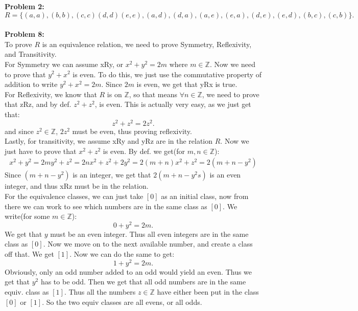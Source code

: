 \documentclass[12pt]{article}
\begin{document}
\noindent
\textbf{Problem 2: }\\
\[
	R = \{(a,a), (b,b), (c,c) (d,d) (e,e), 
	(a,d), (d,a), (a,e), (e,a), (d,e), (e,d), 
	(b,c), (c,b)\}
.\]\\

\noindent
\textbf{Problem 8: }\\
To prove $R$ is an equivalence relation, we need to prove Symmetry, Reflexivity,
and Transitivity.\\
For Symmetry we can assume xRy, or  $x^2 + y^2 = 2m$ where $m \in \mathbb{Z}$. 
Now we need to prove that  $y^2 + x^2$ is even. To do this, we just use the
commutative property of addition to write $y^2 + x^2 = 2m$. Since $2m$ is even,
we get that yRx is true. \\
For Reflexivity, we know that $R$ is on $\mathbb{Z}$, so that means
$\forall n \in \mathbb{Z}$, we need to prove that zRz, and by def. $z^2+z^2$, is even.
This is actually very easy, as we just get that:
\[
z^2+z^2 = 2z^2
.\] 
and since $z^2 \in \mathbb{Z}$, $2z^2$ must be even, thus proving reflexivity.\\
Lastly, for transitivity, we assume xRy and yRz are in the relation $R$. Now 
we just have to prove that $x^2 + z^2$ is even. By def. we get(for $m,n \in \mathbb{Z}$):
\begin{align}
	x^2+y^2=2m
	y^2+z^2=2n
	x^2+z^2+2y^2=2(m+n)
	x^2+z^2 = 2(m+n-y^2)
\end{align}
Since $(m+n-y^2)$ is an integer, we get that $2(m+n-y^2s)$ is an even integer,
and thus xRz must be in the relation. \\
For the equivalence classes, we can just take $[0]$ as an initial class, now from
there we can work to see which numbers are in the same class as  $[0]$. 
We write(for some $m \in \mathbb{Z}$):
 \[
0 + y^2 = 2m
.\] 
We get that $y$ must be an even integer. Thus all even integers are in the same
class as  $[0]$. Now we move on to the next available number, and create a class off
that. We get $[1]$. Now we can do the same to get:
 \[
1+y^2 = 2m
.\] 
Obviously, only an odd number added to an odd would yield an even. Thus we get that 
$y^2$ has to be odd. Then we get that all odd numbers are in the same equiv. class as 
$[1]$. Thus all the numbers $z \in \mathbb{Z}$ have either been put in the class $[0]$
or $[1]$. So the two equiv classes are all evens, or all odds.
\end{document}
